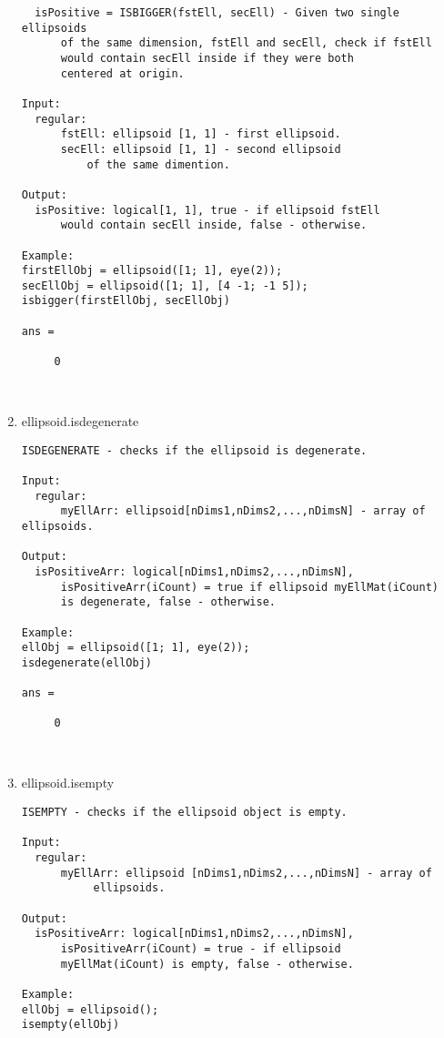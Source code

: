 \begin{enumerate}
\begin{lstlisting}
  isPositive = ISBIGGER(fstEll, secEll) - Given two single ellipsoids
      of the same dimension, fstEll and secEll, check if fstEll
      would contain secEll inside if they were both
      centered at origin.

Input:
  regular:
      fstEll: ellipsoid [1, 1] - first ellipsoid.
      secEll: ellipsoid [1, 1] - second ellipsoid
          of the same dimention.

Output:
  isPositive: logical[1, 1], true - if ellipsoid fstEll
      would contain secEll inside, false - otherwise.

Example:
firstEllObj = ellipsoid([1; 1], eye(2));
secEllObj = ellipsoid([1; 1], [4 -1; -1 5]);
isbigger(firstEllObj, secEllObj)

ans =

     0



\end{lstlisting}
\fontfamily{\familydefault}
\selectfont
\item {ellipsoid.isdegenerate}
\selectfont
\begin{lstlisting}
ISDEGENERATE - checks if the ellipsoid is degenerate.

Input:
  regular:
      myEllArr: ellipsoid[nDims1,nDims2,...,nDimsN] - array of ellipsoids.

Output:
  isPositiveArr: logical[nDims1,nDims2,...,nDimsN],
      isPositiveArr(iCount) = true if ellipsoid myEllMat(iCount)
      is degenerate, false - otherwise.

Example:
ellObj = ellipsoid([1; 1], eye(2));
isdegenerate(ellObj)

ans =

     0



\end{lstlisting}
\fontfamily{\familydefault}
\selectfont
\item {ellipsoid.isempty}
\selectfont
\begin{lstlisting}
ISEMPTY - checks if the ellipsoid object is empty.

Input:
  regular:
      myEllArr: ellipsoid [nDims1,nDims2,...,nDimsN] - array of
           ellipsoids.

Output:
  isPositiveArr: logical[nDims1,nDims2,...,nDimsN],
      isPositiveArr(iCount) = true - if ellipsoid
      myEllMat(iCount) is empty, false - otherwise.

Example:
ellObj = ellipsoid();
isempty(ellObj)


\end{lstlisting}
\end{enumerate}
